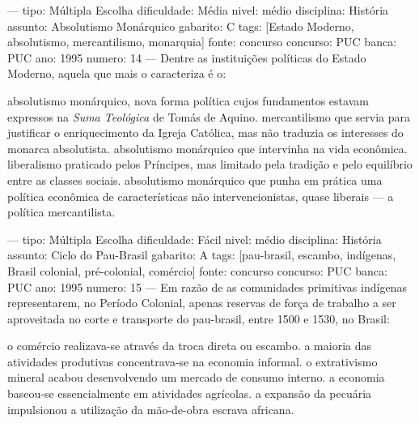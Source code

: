 ---
tipo: Múltipla Escolha
dificuldade: Média
nivel: médio
disciplina: História
assunto: Absolutismo Monárquico
gabarito: C
tags: [Estado Moderno, absolutismo, mercantilismo, monarquia]
fonte: concurso
concurso: PUC
banca: PUC
ano: 1995
numero: 14
---
\question
Dentre as instituições políticas do Estado Moderno, aquela que mais o caracteriza é o:
\begin{choices}
\choice absolutismo monárquico, nova forma política cujos fundamentos estavam expressos na \textit{Suma Teológica} de Tomás de Aquino.
\choice mercantilismo que servia para justificar o enriquecimento da Igreja Católica, mas não traduzia os interesses do monarca absolutista.
\CorrectChoice absolutismo monárquico que intervinha na vida econômica.
\choice liberalismo praticado pelos Príncipes, mas limitado pela tradição e pelo equilíbrio entre as classes sociais.
\choice absolutismo monárquico que punha em prática uma política econômica de características não intervencionistas, quase liberais --- a política mercantilista.
\end{choices}

---
tipo: Múltipla Escolha
dificuldade: Fácil
nivel: médio
disciplina: História
assunto: Ciclo do Pau-Brasil
gabarito: A
tags: [pau-brasil, escambo, indígenas, Brasil colonial, pré-colonial, comércio]
fonte: concurso
concurso: PUC
banca: PUC
ano: 1995
numero: 15
---
\question
Em razão de as comunidades primitivas indígenas representarem, no Período Colonial, apenas reservas de força de trabalho a ser aproveitada no corte e transporte do pau-brasil, entre 1500 e 1530, no Brasil:
\begin{choices}
\CorrectChoice o comércio realizava-se através da troca direta ou escambo.
\choice a maioria das atividades produtivas concentrava-se na economia informal.
\choice o extrativismo mineral acabou desenvolvendo um mercado de consumo interno.
\choice a economia baseou-se essencialmente em atividades agrícolas.
\choice a expansão da pecuária impulsionou a utilização da mão-de-obra escrava africana.
\end{choices}

